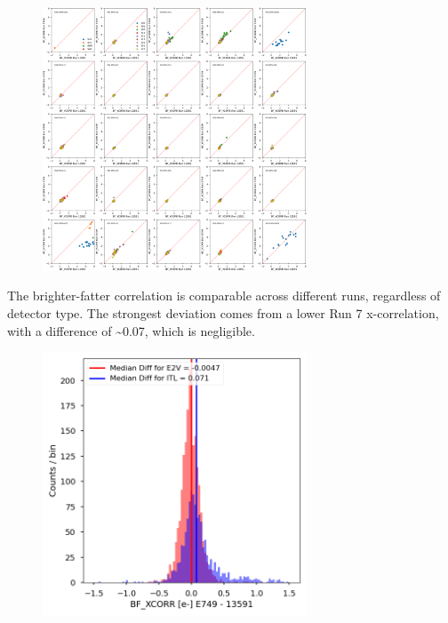 \begin{figure}[H]
\begin{centering}
\includegraphics[width=0.7\textwidth]{sections/figures/baselineCharacterization/13591_E749_BF_YCORR.png}
\end{centering}
\end{figure}

The brighter-fatter correlation is comparable across different runs, regardless of detector type. The strongest deviation comes from a lower Run 7 x-correlation, with a difference of \textasciitilde0.07, which is negligible.

\begin{figure}[H]
\begin{centering}
\includegraphics[width=0.7\textwidth]{sections/figures/baselineCharacterization/BF_XCORR_13591_E749_diff.png}
\end{centering}
\end{figure}

